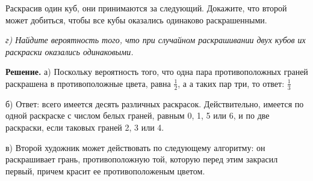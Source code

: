 \documentclass{article}
\begin{document}
\begin{multicols}{3}
{Раскрасив один куб, они принимаются за следующий. Докажите,
что второй может добиться, чтобы все кубы оказались одинаково
раскрашенными.} \par
\textsl{г) Найдите вероятность того, что при случайном раскрашивании двух
кубов их раскраски оказались одинаковыми.} \par
\textbf{Решение.}  а) Поскольку вероятность того, что одна пара
противоположных граней раскрашена в противоположные цвета, равна
$\frac{1}{2}$, а а таких пар три, то ответ: $\frac{1}{3}$ \par
б) Ответ: всего имеется десять различных раскрасок. Действительно,
имеется по одной раскраске с числом белых граней, равным 0, 1, 5 или 6, и
по две раскраски, если таковых граней 2, 3 или 4. \par
в) Второй художник может действовать по следующему алгоритму:
он раскрашивает грань, противоположную той, которую перед этим
закрасил первый, причем красит ее противоположеным цветом.
\end{multicols}
\end{document}

